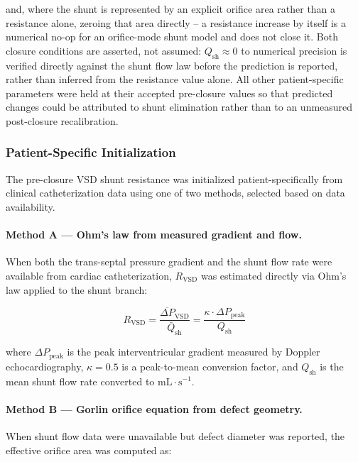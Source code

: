 \documentclass{article}
\begin{document}
\noindent and, where the shunt is represented by an explicit orifice area
rather than a resistance alone, zeroing that area directly -- a resistance
increase by itself is a numerical no-op for an orifice-mode shunt model and
does not close it. Both closure conditions are asserted, not assumed:
$Q_\mathrm{sh} \approx 0$ to numerical precision is verified directly
against the shunt flow law before the prediction is reported, rather than
inferred from the resistance value alone. All other patient-specific parameters were held at their
accepted pre-closure values so that predicted changes could be attributed
to shunt elimination rather than to an unmeasured post-closure recalibration.

\subsubsection{Patient-Specific Initialization}
\label{sec:vsd_initialization}
\label{sec:rvsd_init}

The pre-closure VSD shunt resistance was initialized
patient-specifically from clinical catheterization data using one
of two methods, selected based on data availability.

\paragraph{Method A — Ohm's law from measured gradient and flow.}
When both the trans-septal pressure gradient and the shunt flow
rate were available from cardiac catheterization, $R_\mathrm{VSD}$
was estimated directly via Ohm's law applied to the shunt branch:

\begin{equation}
    R_\mathrm{VSD}
    = \frac{\overline{\Delta P}_\mathrm{VSD}}{\bar{Q}_\mathrm{sh}}
    = \frac{\kappa \cdot \Delta P_\mathrm{peak}}{Q_\mathrm{sh}}
    \label{eq:rvsd_ohm}
\end{equation}

\noindent where $\Delta P_\mathrm{peak}$ is the peak
interventricular gradient measured by Doppler echocardiography,
$\kappa = 0.5$ is a peak-to-mean conversion factor, and
$Q_\mathrm{sh}$ is the mean shunt flow rate converted to
$\mathrm{mL{\cdot}s^{-1}}$.

\paragraph{Method B — Gorlin orifice equation from defect geometry.}
When shunt flow data were unavailable but defect diameter was
reported, the effective orifice area was computed as:
\end{document}
